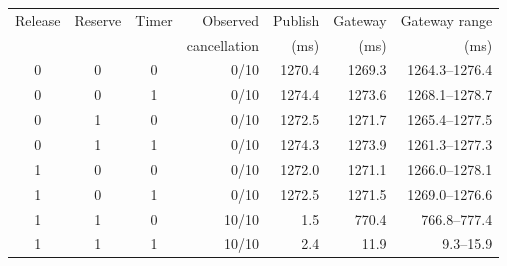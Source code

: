 \begin{tabular}{@{}ccc r r r r@{}}\toprule Release & Reserve & Timer & Observed & Publish & Gateway & Gateway range\\ & & & cancellation & (ms) & (ms) & (ms)\\\midrule
0 & 0 & 0 & 0/10 & 1270.4 & 1269.3 & 1264.3--1276.4 \\
0 & 0 & 1 & 0/10 & 1274.4 & 1273.6 & 1268.1--1278.7 \\
0 & 1 & 0 & 0/10 & 1272.5 & 1271.7 & 1265.4--1277.5 \\
0 & 1 & 1 & 0/10 & 1274.3 & 1273.9 & 1261.3--1277.3 \\
1 & 0 & 0 & 0/10 & 1272.0 & 1271.1 & 1266.0--1278.1 \\
1 & 0 & 1 & 0/10 & 1272.5 & 1271.5 & 1269.0--1276.6 \\
1 & 1 & 0 & 10/10 & 1.5 & 770.4 & 766.8--777.4 \\
1 & 1 & 1 & 10/10 & 2.4 & 11.9 & 9.3--15.9 \\
\bottomrule\end{tabular}
